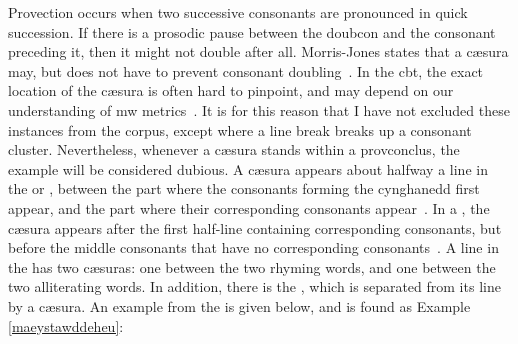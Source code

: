Provection occurs when two successive consonants are pronounced in quick succession. If there is a prosodic pause between the \gls{doubcon} and the consonant preceding it, then it might not double after all. Morris-Jones states that a c\ae sura may, but does not have to prevent consonant doubling~\parencite[\S 392]{morris-jones_cerdd_1925}. In the \gls{cbt}, the exact location of the c\ae sura is often hard to pinpoint, and may depend on our understanding of \gls{mw} metrics~\parencite[241]{daniel_cyfuniadau_2003}. It is for this reason that I have not excluded these instances from the corpus, except where a line break breaks up a consonant cluster. Nevertheless, whenever a c\ae sura stands within a \gls{provconclus}, the example will be considered dubious. A c\ae sura appears about halfway a line in the  or , \ie between the part where the consonants forming the cynghanedd first appear, and the part where their corresponding consonants appear~\autocite[\S 233]{morris-jones_cerdd_1925}. In a , the c\ae sura  appears after the first half-line containing corresponding consonants, but before the middle consonants that have no corresponding consonants~\autocite[\S 255]{morris-jones_cerdd_1925}. A line in the  has two c\ae suras: one between the two rhyming words, and one between the two alliterating words. In addition, there is the , which is separated from its line by a c\ae sura.
%
%
%
%
An example from the  is given below, and is found as Example \ref{maeystawddeheu}: %
